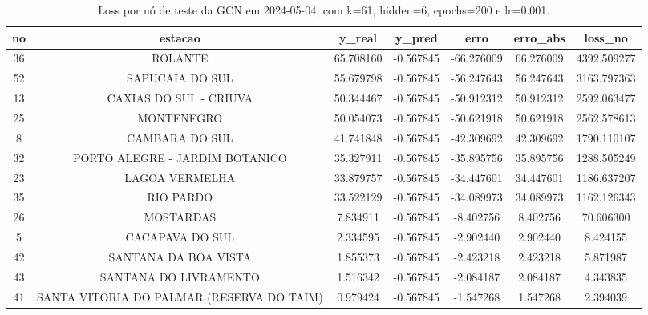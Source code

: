 \begin{table}[h]
\centering
\caption{Loss por nó de teste da GCN em 2024-05-04, com k=61, hidden=6, epochs=200 e lr=0.001.}
\label{tab:gcn_loss_nodes_k61_hidden6}
\begin{tabular}{ccccccc}
\toprule
no & estacao & y\_real & y\_pred & erro & erro\_abs & loss\_no \\
\midrule
36 & ROLANTE & 65.708160 & -0.567845 & -66.276009 & 66.276009 & 4392.509277 \\
52 & SAPUCAIA DO SUL & 55.679798 & -0.567845 & -56.247643 & 56.247643 & 3163.797363 \\
13 & CAXIAS DO SUL - CRIUVA & 50.344467 & -0.567845 & -50.912312 & 50.912312 & 2592.063477 \\
25 & MONTENEGRO & 50.054073 & -0.567845 & -50.621918 & 50.621918 & 2562.578613 \\
8 & CAMBARA DO SUL & 41.741848 & -0.567845 & -42.309692 & 42.309692 & 1790.110107 \\
32 & PORTO ALEGRE - JARDIM BOTANICO & 35.327911 & -0.567845 & -35.895756 & 35.895756 & 1288.505249 \\
23 & LAGOA VERMELHA & 33.879757 & -0.567845 & -34.447601 & 34.447601 & 1186.637207 \\
35 & RIO PARDO & 33.522129 & -0.567845 & -34.089973 & 34.089973 & 1162.126343 \\
26 & MOSTARDAS & 7.834911 & -0.567845 & -8.402756 & 8.402756 & 70.606300 \\
5 & CACAPAVA DO SUL & 2.334595 & -0.567845 & -2.902440 & 2.902440 & 8.424155 \\
42 & SANTANA DA BOA VISTA & 1.855373 & -0.567845 & -2.423218 & 2.423218 & 5.871987 \\
43 & SANTANA DO LIVRAMENTO & 1.516342 & -0.567845 & -2.084187 & 2.084187 & 4.343835 \\
41 & SANTA VITORIA DO PALMAR (RESERVA DO TAIM) & 0.979424 & -0.567845 & -1.547268 & 1.547268 & 2.394039 \\
\bottomrule
\end{tabular}
\end{table}
